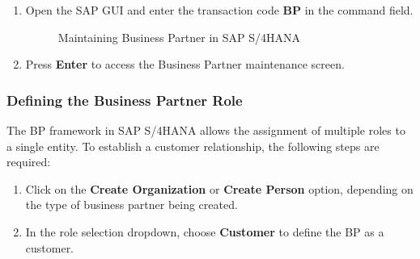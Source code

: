 \begin{enumerate}
    \item Open the SAP GUI and enter the transaction code \textbf{BP} in the command field.

    \begin{figure}[H]
    \centering
    \caption{Maintaining Business Partner in SAP S/4HANA}
    
    \end{figure}


    
    \item Press \textbf{Enter} to access the Business Partner maintenance screen.
\end{enumerate}



\subsubsection{Defining the Business Partner Role}
The BP framework in SAP S/4HANA allows the assignment of multiple roles to a single entity. To establish a customer relationship, the following steps are required:

\begin{enumerate}
    \item Click on the \textbf{Create Organization} or \textbf{Create Person} option, depending on the type of business partner being created.
    \item In the role selection dropdown, choose \textbf{Customer} to define the BP as a customer.
\end{enumerate}


